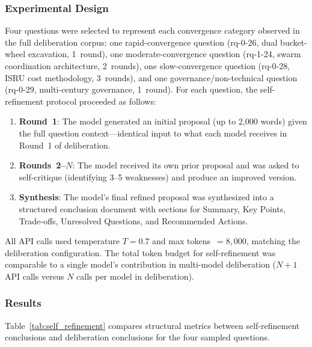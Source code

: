\documentclass[11pt,a4paper]{article}
\begin{document}
\subsubsection{Experimental Design}

Four questions were selected to represent each convergence category observed in the full deliberation corpus: one rapid-convergence question (rq-0-26, dual bucket-wheel excavation, 1~round), one moderate-convergence question (rq-1-24, swarm coordination architecture, 2~rounds), one slow-convergence question (rq-0-28, ISRU cost methodology, 3~rounds), and one governance/non-technical question (rq-0-29, multi-century governance, 1~round). For each question, the self-refinement protocol proceeded as follows:

\begin{enumerate}[nosep]
    \item \textbf{Round~1}: The model generated an initial proposal (up to 2{,}000 words) given the full question context---identical input to what each model receives in Round~1 of deliberation.
    \item \textbf{Rounds~2--$N$}: The model received its own prior proposal and was asked to self-critique (identifying 3--5 weaknesses) and produce an improved version.
    \item \textbf{Synthesis}: The model's final refined proposal was synthesized into a structured conclusion document with sections for Summary, Key Points, Trade-offs, Unresolved Questions, and Recommended Actions.
\end{enumerate}

All API calls used temperature $T = 0.7$ and max tokens~$= 8{,}000$, matching the deliberation configuration. The total token budget for self-refinement was comparable to a single model's contribution in multi-model deliberation ($N + 1$ API calls versus $N$ calls per model in deliberation).

\subsubsection{Results}

Table~\ref{tab:self_refinement} compares structural metrics between self-refinement conclusions and deliberation conclusions for the four sampled questions.
\end{document}
